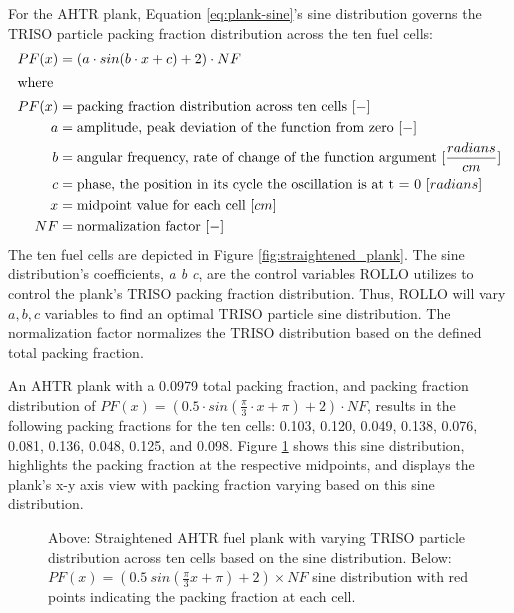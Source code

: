 For the \gls{AHTR} plank, Equation \ref{eq:plank-sine}'s sine distribution governs 
the \gls{TRISO} particle packing fraction distribution across the ten fuel cells:
\begin{align}
    \label{eq:plank-sine}
    PF(x) &= \left(a\cdot sin(b\cdot x + c) + 2\right) \cdot NF\\
    \intertext{where}
    PF(x) &= \mbox{packing fraction distribution across ten cells } [-] \nonumber \\ 
    a &= \mbox{amplitude, peak deviation of the function from zero } [-] \nonumber \\
    b &= \mbox{angular frequency, rate of change of the function argument } [\frac{radians}{cm}] \nonumber \\
    c &= \mbox{phase, the position in its cycle the oscillation is at t = 0 } [radians]\nonumber \\
    x &= \mbox{midpoint value for each cell } [cm]\nonumber \\
    NF &= \mbox{normalization factor } [-]\nonumber
\end{align}
The ten fuel cells are depicted in Figure \ref{fig:straightened_plank}.
The sine distribution's coefficients, \textit{a b c}, are the control variables 
\gls{ROLLO} utilizes to control the plank's TRISO packing fraction distribution.
Thus, \gls{ROLLO} will vary $a, b, c$ variables to find an optimal TRISO particle 
sine distribution. 
The normalization factor normalizes the \gls{TRISO} distribution based on the 
defined total packing fraction.

An \gls{AHTR} plank with a 0.0979 total packing fraction, and packing fraction 
distribution of $PF(x) = \left(0.5\cdot sin(\frac{\pi}{3}\cdot x + \pi) + 2\right) 
\cdot NF$, results in the following packing fractions for the ten cells: 0.103, 0.120, 
0.049, 0.138, 0.076, 0.081, 0.136, 0.048, 0.125, and 0.098. 
Figure \ref{fig:triso_distribution} shows this sine distribution, highlights 
the packing fraction at the respective midpoints, and displays the plank's x-y 
axis view with packing fraction varying based on this sine distribution. 
\begin{figure}[htbp]
    \centering
    \caption{Above: Straightened \acrfull{AHTR} fuel plank with varying \gls{TRISO} particle 
    distribution across ten cells based on the sine distribution. 
    Below: $PF(x) = (0.5\ sin(\frac{\pi}{3}x + \pi) + 2)  \times NF$ 
    sine distribution with red points indicating the packing fraction at each cell.}
    \label{fig:triso_distribution}
\end{figure}


